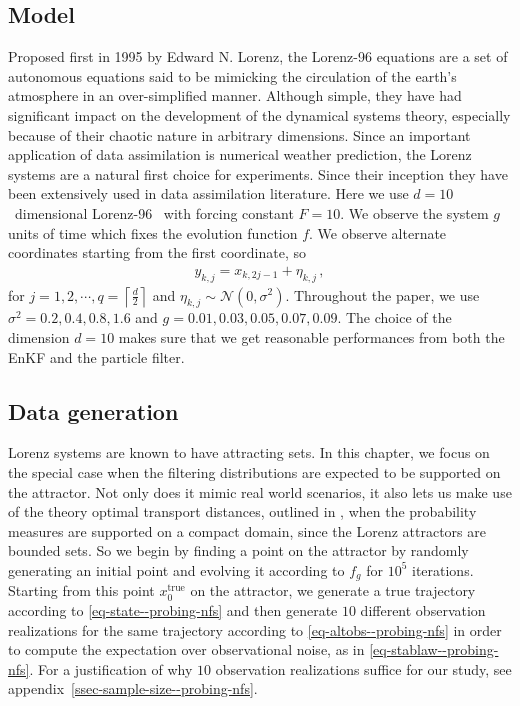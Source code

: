 \subsection{Model} \label{ssec-models--probing-nfs}
Proposed first in 1995 by Edward N. Lorenz, the Lorenz-96 equations are a set of autonomous equations said to be mimicking the circulation of the earth's atmosphere in an over-simplified manner. Although simple, they have had significant impact on the development of the dynamical systems theory, especially because of their chaotic nature in arbitrary dimensions. Since an important application of data assimilation is numerical weather prediction, the Lorenz systems are a natural first choice for experiments. Since their inception they have been extensively used in data assimilation literature. Here we use $d = 10$~dimensional Lorenz-96~\cite{Lorenz96, kekem2018dynamics} with forcing constant $F=10$. We observe the system $g$ units of time which fixes the evolution function $f$. We observe alternate coordinates starting from the first coordinate, so
\begin{align}
    y_{k,j} = x_{k,2j-1} + \eta_{k,j} \,,
\label{eq-altobs--probing-nfs} \end{align}
for $j=1, 2, \cdots, q = \left\lceil\frac{d}{2}\right\rceil$ and $\eta_{k, j}\sim\mathcal N(0, \sigma^2)$. Throughout the paper, we use $\sigma^2=0.2, 0.4, 0.8, 1.6$ and \newline $g=0.01, 0.03, 0.05, 0.07, 0.09$. The choice of the dimension $d=10$  makes sure that we get reasonable performances from both the EnKF and the particle filter.


\subsection{Data generation}
Lorenz systems are known to have attracting sets. In  this chapter, we focus on the special case when the filtering distributions are expected to be supported on the attractor. Not only does it mimic real world scenarios, it also lets us make use of the theory optimal transport distances, outlined in \cite{feydy2019interpolating}, when the probability measures are supported on a compact domain, since the Lorenz attractors are bounded sets. So we begin by finding a point on the attractor by randomly generating an initial point and evolving it according to $f_g$ for $10^5$ iterations. Starting from this point $x_0^{\text{true}}$ on the attractor, we generate a true trajectory according to \eqref{eq-state--probing-nfs} and then generate $10$ different observation realizations for the same trajectory according to \eqref{eq-altobs--probing-nfs} in order to compute the expectation over observational noise, as in \eqref{eq-stablaw--probing-nfs}. {\color{mypink} For a justification of why $10$ observation realizations suffice for our study, see appendix~\ref{ssec-sample-size--probing-nfs}}. 

